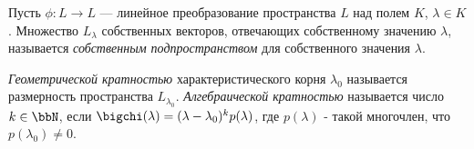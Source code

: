 \begin{defn}
Пусть $\phi:L\rightarrow L$ --- линейное преобразование пространства $L$ над полем $K$, $\lambda \in K$. Множество $L_\lambda$ собственных векторов, отвечающих собственному значению $\lambda$, называется \textit{собственным подпространством} для собственного значения $\lambda$.
\end{defn}
\begin{defn}
\textit{Геометрической кратностью} характеристического корня $\lambda_0$ называется размерность пространства $L_{\lambda_0}$.
\textit{Алгебраической кратностью} называется число $k \in \bbN$, если $\bigchi(\lambda)=(\lambda-\lambda_0)^k p(\lambda)$, где $p(\lambda)$ - такой многочлен, что $p(\lambda_0) \neq 0$.
\end{defn}

$ $\\ $ $\\

